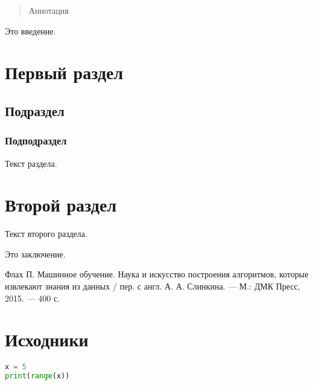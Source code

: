 \documentclass{amcs}
\begin{document}
\setfemale
{}
\maketitlepage

\begin{abstract}
  Аннотация
\end{abstract}

\tableofcontents

Это введение.

\section{Первый раздел}
\subsection{Подраздел}
\subsubsection{Подподраздел}
Текст раздела.

\section{Второй раздел}
Текст второго раздела.

Это заключение.

\begin{thebibliography}{99}
  Флах П.
  Машинное обучение. Наука и искусство построения алгоритмов, которые
  извлекают знания из данных / пер. с англ. А. А. Слинкина. --- М.: ДМК Пресс,
  2015. --- 400 с.
\end{thebibliography}

\appendix

\section{Исходники}
\begin{lstlisting}[language=Python]
x = 5
print(range(x))
\end{lstlisting}
\end{document}
